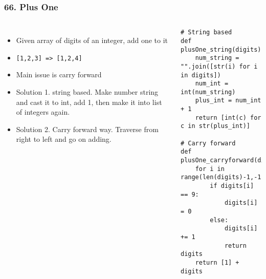 \begin{frame}[fragile]\frametitle{66. Plus One}

	\begin{columns}[T]
	\begin{itemize}
	\item Given array of digits of an integer, add one to it
	\item \lstinline{[1,2,3] => [1,2,4]}
	\item Main issue is carry forward
	\item Solution 1. string based. Make number string and cast it to int, add 1, then make it into list of integers again.
	\item Solution 2. Carry forward way. Traverse from right to left and go on adding.
	\end{itemize}
		\begin{lstlisting}[basicstyle=\scriptsize]
# String based
def plusOne_string(digits):
    num_string = "".join([str(i) for i in digits])
    num_int = int(num_string)
    plus_int = num_int + 1
    return [int(c) for c in str(plus_int)]
	
# Carry forward	
def plusOne_carryforward(digits):
    for i in range(len(digits)-1,-1,-1):
        if digits[i] == 9:
            digits[i] = 0
        else:
            digits[i] += 1
            return digits
    return [1] + digits		
				\end{lstlisting}		

	\end{columns}
		
\end{frame}

